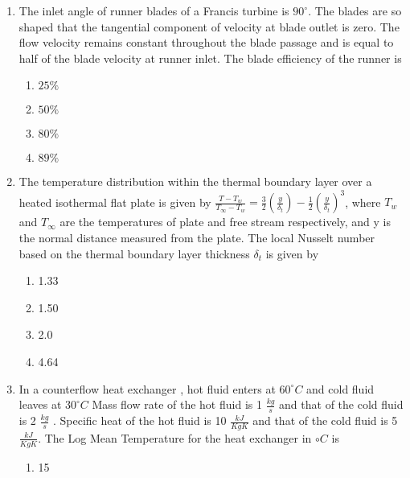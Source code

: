 \documentclass[journal]{IEEEtran}
\begin{document}
\begin{enumerate}
    

    \item The inlet angle of runner blades of a Francis turbine is $90^{\circ}$. The blades are so shaped that the tangential component of velocity at blade outlet is zero. The flow velocity remains constant throughout the blade passage and is equal to half of the blade velocity at runner inlet. The blade efficiency of the runner is
    \begin{multicols}{4}
            \begin{enumerate}
            \item $25 \%$
            \item $50 \%$
            \item $80 \%$
            \item $89 \%$
            \end{enumerate}
        \end{multicols}
    \item  The temperature distribution within the thermal boundary layer over a heated isothermal flat plate is given by
	    $\frac{T-T_w}{T_\infty-T_w}=\frac{3}{2}(\frac{y}{\delta_t})-\frac{1}{2}(\frac{y}{\delta_t})^3$, where $T_w$ and $T_\infty$ are the temperatures of plate and free stream respectively, and y is the normal distance measured from the plate. The local Nusselt number based on the thermal boundary layer thickness $\delta_{t}$ is given by
    \begin{multicols}{4}
            \begin{enumerate}
              \item 1.33
              \item 1.50
              \item 2.0
              \item 4.64
            \end{enumerate}
        \end{multicols}
\item In a counterflow heat exchanger , hot fluid enters at $60^{\circ} C$ and cold fluid leaves at $30^{\circ} C$ Mass flow rate of the hot fluid is 1 $\frac{kg}{s}$ and that of the cold fluid is 2 $\frac{kg}{s}$ . Specific heat of the hot fluid is 10 $\frac{kJ}{KgK}$ and that of the cold  fluid is 5 $\frac{kJ}{KgK}$. The Log Mean Temperature for the heat exchanger in ${\circ} C$ is 
    \begin{multicols}{4}
            \begin{enumerate}
              \item 15

\end{enumerate}
\end{multicols}
\end{enumerate}
\end{document}
